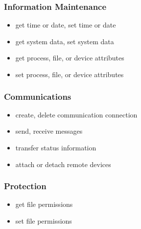 \documentclass{article}
\begin{document}
\subsubsection{Information Maintenance}
\begin{itemize}
    \item get time or date, set time or date
    \item get system data, set system data
    \item get process, file, or device attributes
    \item set process, file, or device attributes
\end{itemize}
\subsubsection{Communications}
\begin{itemize}
    \item create, delete communication connection
    \item send, receive messages
    \item transfer status information
    \item attach or detach remote devices
\end{itemize}
\subsubsection{Protection}
\begin{itemize}
    \item get file permissions
    \item set file permissions
\end{itemize}
\end{document}
